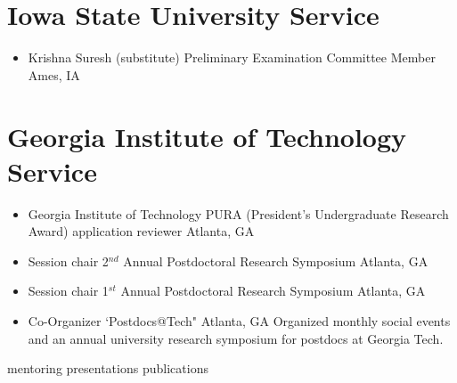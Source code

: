 \documentclass[11pt,a4paper,sans]{moderncv}
\begin{document}
\section{Iowa State University Service}
\vspace{5pt}
\begin{itemize}
	\item{
		{Krishna Suresh (substitute)}
		{Preliminary Examination Committee Member}
		{Ames, IA}
		{}
		{}
		{}
	}
\end{itemize}

\section{Georgia Institute of Technology Service}
\vspace{5pt}
\begin{itemize}
	\item{
          {Georgia Institute of Technology}
          {PURA (President's Undergraduate Research Award) application reviewer}
          {Atlanta, GA}
          {}
          {}}
	\item{
	     {Session chair}
         {2$^{nd}$ Annual Postdoctoral Research Symposium}
         {Atlanta, GA}
         {}
         {}}
	\item{
          {Session chair}
          {1$^{st}$ Annual Postdoctoral Research Symposium}
          {Atlanta, GA}
          {}
          {}}
	\item{
        {Co-Organizer}
        {`Postdocs@Tech"}
        {Atlanta, GA}
        {}
        {Organized monthly social events and an annual university research symposium for postdocs at Georgia Tech.}}
\end{itemize}

{mentoring}
{presentations}
{publications}
\end{document}
